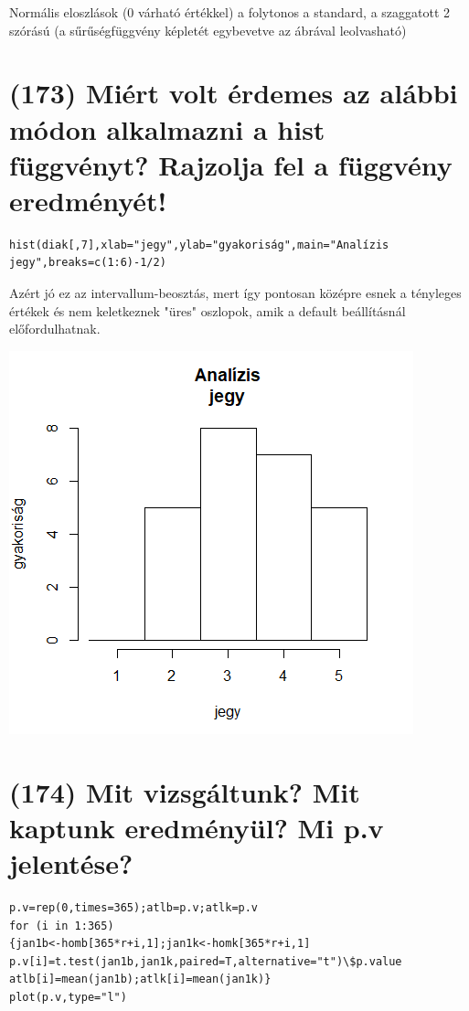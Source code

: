 \documentclass[12p]{article}
\begin{document}
 Normális eloszlások (0 várható értékkel) a folytonos a standard, a szaggatott 2 szórású
(a sűrűségfüggvény képletét egybevetve az ábrával leolvasható)


\section{(173) Miért volt érdemes az alábbi módon alkalmazni a hist függvényt? Rajzolja fel a függvény eredményét! }

\begin{verbatim}
hist(diak[,7],xlab="jegy",ylab="gyakoriság",main="Analízis
jegy",breaks=c(1:6)-1/2)
\end{verbatim}

Azért jó ez az intervallum-beosztás, mert így pontosan középre esnek a tényleges értékek
és nem keletkeznek "üres" oszlopok, amik a default beállításnál előfordulhatnak.

\includegraphics{histogram}

\section{(174)  Mit vizsgáltunk? Mit kaptunk eredményül? Mi p.v jelentése?}

\begin{verbatim}
p.v=rep(0,times=365);atlb=p.v;atlk=p.v
for (i in 1:365)
{jan1b<-homb[365*r+i,1];jan1k<-homk[365*r+i,1]
p.v[i]=t.test(jan1b,jan1k,paired=T,alternative="t")\$p.value
atlb[i]=mean(jan1b);atlk[i]=mean(jan1k)}
plot(p.v,type="l")
\end{verbatim}
\end{document}

